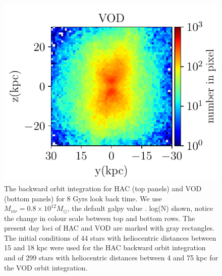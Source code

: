 \documentclass[fleqn,usenatbib]{mnras}
\begin{document}
\begin{figure}
	     	     	     \includegraphics[scale=0.52]{VOD_orbits_8Gyrs_yz_defaultmass.pdf}
   \caption{The backward orbit integration for HAC (top panels) and VOD (bottom panels) for 8 Gyrs look back time. We use $M_{vir} = 0.8 \times 10^{12} M_{\odot}$, the default galpy value . log(N) shown, notice the change in colour scale between top and bottom rows. The present day loci of  HAC and VOD are marked with gray rectangles. The initial conditions of 44 stars with heliocentric distances between 15 and 18 kpc were used for the HAC backward orbit integration and of 299 stars with heliocentric distances between 4 and 75 kpc for the VOD orbit integration.}
    \label{fig:orbitslb}
\end{figure}
\end{document}
